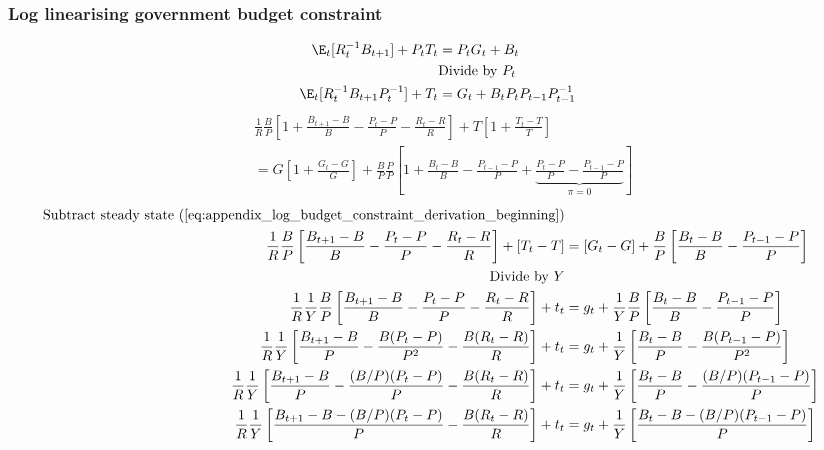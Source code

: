 \subsubsection*{Log linearising government budget constraint}
\begin{align} \label{eq:appendix_log_budget_constraint_derivation_beginning}
    \E_t [R^{-1}_tB_{t+1}] + P_t T_t &= P_tG_t + B_t\\
    &\text{Divide by $P_t$} \nonumber\\
    \E_t [R^{-1}_tB_{t+1}P_t^{-1}] + T_t &= G_t + B_tP_t P_{t-1} P^{-1}_{t-1}
\end{align} 
\begin{align}   
    &\frac{1}{R}\frac{B}{P}\left[ 1 + \frac{B_{t+1}-B}{B} - \frac{P_t - P}{P} - \frac{R_t-R}{R}\right] + T\left[ 1 + \frac{T_t - T}{T} \right] \nonumber \\ 
    &= G\left[ 1 + \frac{G_t - G}{G} \right] + \frac{B}{P} \frac{P}{P} \left[ 1 + \frac{B_t - B}{B} - \frac{P_{t-1} - P}{P} + \underbrace{\frac{P_{t} - P}{P} - \frac{P_{t-1} - P}{P}}_{\pi = 0}\right]
\end{align}
\begin{align}
    \text{Subtract steady state (\ref{eq:appendix_log_budget_constraint_derivation_beginning})}\nonumber \\
    \frac{1}{R}\frac{B}{P}\left[\frac{B_{t+1}-B}{B} - \frac{P_t - P}{P} - \frac{R_t-R}{R}\right] + \left[T_t - T \right] &= \left[G_t - G \right] + \frac{B}{P} \left[\frac{B_t - B}{B} - \frac{P_{t-1} - P}{P}\right]\\
    \text{Divide by $Y$} \nonumber\\
    \frac{1}{R}\frac{1}{Y}\frac{B}{P}\left[\frac{B_{t+1}-B}{B} - \frac{P_t - P}{P} - \frac{R_t-R}{R}\right] + t_t &= g_t + \frac{1}{Y}\frac{B}{P} \left[\frac{B_t - B}{B} - \frac{P_{t-1} - P}{P}\right]\\
    \frac{1}{R}\frac{1}{Y}\left[\frac{B_{t+1}-B}{P} - \frac{B(P_t - P)}{P^{2}} - \frac{B(R_t-R)}{R}\right] + t_t &= g_t + \frac{1}{Y} \left[\frac{B_t-B}{P} - \frac{B(P_{t-1} - P)}{P^{2}}\right]\\
    \frac{1}{R}\frac{1}{Y}\left[\frac{B_{t+1}-B}{P} - \frac{(B/P)(P_t - P)}{P} - \frac{B(R_t-R)}{R}\right] + t_t &= g_t + \frac{1}{Y} \left[\frac{B_t-B}{P} - \frac{(B/P)(P_{t-1} - P)}{P}\right]\\
    \frac{1}{R}\frac{1}{Y}\left[\frac{B_{t+1}-B - (B/P)(P_t - P)}{P} - \frac{B(R_t-R)}{R}\right] + t_t &= g_t + \frac{1}{Y} \left[\frac{B_{t}-B - (B/P)(P_{t-1} - P)}{P}\right]
\end{align}
